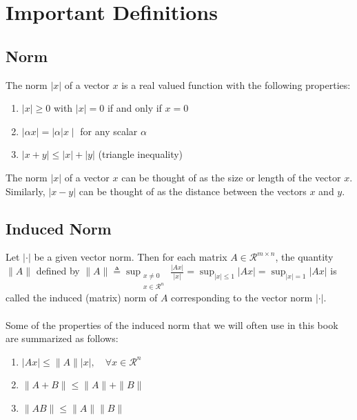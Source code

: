 \documentclass{article}
\begin{document}
\section{Important Definitions}
\subsection{Norm}
The norm $|x|$ of a vector $x$ is a real valued function with the following properties:
\begin{enumerate}[label=(\roman*)]
	\item $|x| \geq 0$ with $|x|=0$ if and only if $x=0$
	\item $|\alpha x|=|\alpha| x \mid$ for any scalar $\alpha$
	\item $|x+y| \leq|x|+|y|$ (triangle inequality)
\end{enumerate}
The norm $|x|$ of a vector $x$ can be thought of as the size or length of the vector $x$. Similarly, $|x-y|$ can be thought of as the distance between the vectors $x$ and $y$.
\subsection{Induced Norm}
Let $|\cdot|$ be a given vector norm. Then for each matrix $A \in \mathcal{R}^{m \times n}$, the quantity $\|A\|$ defined by
\(
\|A\| \triangleq \sup _{\substack{x \neq 0 \\ x \in \mathcal{R}^n}} \frac{|A x|}{|x|}=\sup _{|x| \leq 1}|A x|=\sup _{|x|=1}|A x|
\)
is called the induced (matrix) norm of $A$ corresponding to the vector norm $|\cdot|$.
\\\\
Some of the properties of the induced norm that we will often use in this book are summarized as follows:
\begin{enumerate}[label=(\roman*)]
	\item $|A x| \leq\|A\||x|, \quad \forall x \in \mathcal{R}^n$
	\item $\|A+B\| \leq\|A\|+\|B\|$
	\item $\|A B\| \leq\|A\|\|B\|$
\end{enumerate}
\end{document}
